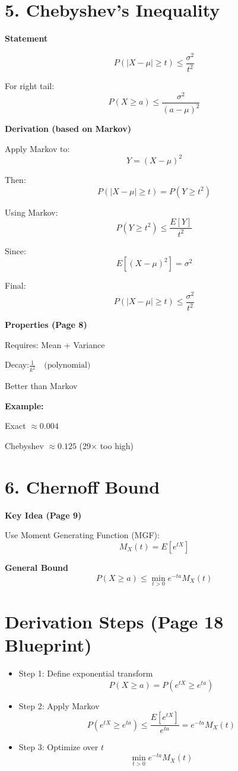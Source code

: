 \documentclass{article}
\begin{document}
\section*{5. Chebyshev's Inequality}

\textbf{Statement}

\[P(|X - \mu| \ge t) \le \frac{\sigma^2}{t^2}\]

For right tail:
\[P(X \ge a) \le \frac{\sigma^2}{(a - \mu)^2}\]

\textbf{Derivation (based on Markov)}

Apply Markov to:
\[Y = (X - \mu)^2\]

Then:
\[P(|X - \mu| \ge t) = P(Y \ge t^2)\]

Using Markov:
\[P(Y \ge t^2) \le \frac{E[Y]}{t^2}\]

Since:
\[E[(X - \mu)^2] = \sigma^2\]

Final:
\[P(|X - \mu| \ge t) \le \frac{\sigma^2}{t^2}\]

\textbf{Properties (Page 8)}

Requires: Mean + Variance

Decay:$\frac{1}{k^2} \quad \text{(polynomial)}
$

Better than Markov

\textbf{Example:}

Exact $\approx 0.004$

Chebyshev $\approx 0.125$ (29$\times$ too high)

\section*{6. Chernoff Bound}

\textbf{Key Idea (Page 9)}

Use Moment Generating Function (MGF):
\[M_X(t) = E[e^{tX}]\]

\textbf{General Bound}
\[P(X \ge a) \le \min_{t > 0} e^{-ta} M_X(t)\]

\section*{Derivation Steps (Page 18 Blueprint)}
\begin{itemize}
    \item Step 1: Define exponential transform
    \[P(X \ge a) = P(e^{tX} \ge e^{ta})\]
    \item Step 2: Apply Markov
    \[P(e^{tX} \ge e^{ta}) \le \frac{E[e^{tX}]}{e^{ta}}= e^{-ta} M_X(t)\]
    \item Step 3: Optimize over $t$
    \[\min_{t > 0} e^{-ta} M_X(t)\]
\end{itemize}
\end{document}
